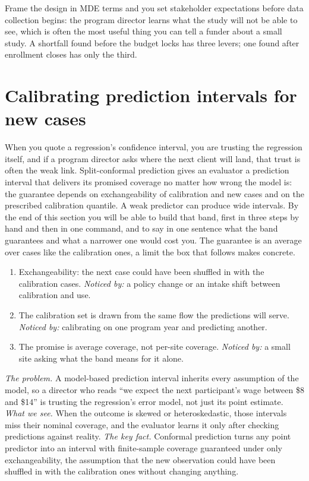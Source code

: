 Frame the design in MDE terms and you set stakeholder expectations before data collection begins: the program director learns what the study will not be able to see, which is often the most useful thing you can tell a funder about a small study. A shortfall found before the budget locks has three levers; one found after enrollment closes has only the third.

\section{Calibrating prediction intervals for new cases}\label{sec:conformal}
When you quote a regression's confidence interval, you are trusting the regression itself, and if a program director asks where the next client will land, that trust is often the weak link. Split-conformal prediction gives an evaluator a prediction interval that delivers its promised coverage no matter how wrong the model is: the guarantee depends on exchangeability of calibration and new cases and on the prescribed calibration quantile. A weak predictor can produce wide intervals. By the end of this section you will be able to build that band, first in three steps by hand and then in one command, and to say in one sentence what the band guarantees and what a narrower one would cost you. The guarantee is an average over cases like the calibration ones, a limit the box that follows makes concrete.

\begin{restson}
\begin{enumerate}
\item Exchangeability: the next case could have been shuffled in with the calibration cases. \emph{Noticed by:} a policy change or an intake shift between calibration and use.
\item The calibration set is drawn from the same flow the predictions will serve. \emph{Noticed by:} calibrating on one program year and predicting another.
\item The promise is average coverage, not per-site coverage. \emph{Noticed by:} a small site asking what the band means for it alone.
\end{enumerate}
\end{restson}

\emph{The problem.} A model-based prediction interval inherits every assumption of the model, so a director who reads \enquote{we expect the next participant's wage between \$8 and \$14} is trusting the regression's error model, not just its point estimate. \emph{What we see.} When the outcome is skewed or heteroskedastic, those intervals miss their nominal coverage, and the evaluator learns it only after checking predictions against reality. \emph{The key fact.} Conformal prediction \parencite{shafer2008tutorial,angelopoulos2023conformal} turns any point predictor into an interval with finite-sample coverage guaranteed under only exchangeability, the assumption that the new observation could have been shuffled in with the calibration ones without changing anything.

